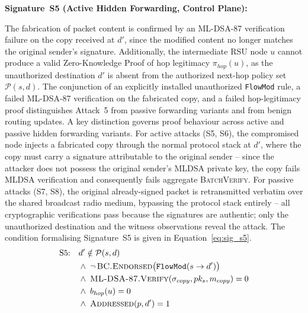 \documentclass[12pt, a4paper]{report}
\begin{document}
\textbf{Signature~S5 (Active Hidden Forwarding, Control Plane):}

The fabrication of packet content is confirmed by an ML-DSA-87 verification
failure on the copy received at $d'$, since the modified content no longer
matches the original sender's signature.
Additionally, the intermediate RSU node $u$ cannot produce a valid
Zero-Knowledge Proof of hop legitimacy $\pi_{hop}(u)$, as the unauthorized
destination $d'$ is absent from the authorized next-hop policy set
$\mathcal{P}(s,d)$.
The conjunction of an explicitly installed unauthorized \texttt{FlowMod}
rule, a failed ML-DSA-87 verification on the fabricated copy, and a failed
hop-legitimacy proof distinguishes Attack~5 from passive forwarding variants and from benign routing updates. A key distinction governs proof behaviour across active
and passive hidden forwarding variants. For active attacks
(S5, S6), the compromised node injects a fabricated copy
through the normal protocol stack at $d'$, where the
copy must carry a signature attributable to the original
sender -- since the attacker does not possess the
original sender's \ac{MLDSA} private key, the copy
fails \ac{MLDSA} verification and consequently fails
aggregate \textsc{BatchVerify}. For passive attacks
(S7, S8), the original already-signed packet is
retransmitted verbatim over the shared broadcast radio
medium, bypassing the protocol stack entirely -- all
cryptographic verifications pass because the
signatures are authentic; only the unauthorized
destination and the witness observations reveal the
attack.
The condition formalising Signature~S5 is given in
Equation~\eqref{eq:sig_s5}.
\begin{equation}
\begin{aligned}
\text{S5:}\quad
  & d' \notin \mathcal{P}(s,d) \\
  & \wedge\; \neg\,\textsc{BC.Endorsed}\big(\texttt{FlowMod}(s \to d')\big) \\
  & \wedge\; \textsc{ML-DSA-87.Verify}(
    \sigma_{copy}, pk_s, m_{copy}) = 0 \\
  & \wedge\; b_{hop}(u) = 0 \\
  & \wedge\; \textsc{Addressed}(p, d') = 1
\end{aligned}
\label{eq:sig_s5}
\end{equation}
\end{document}
